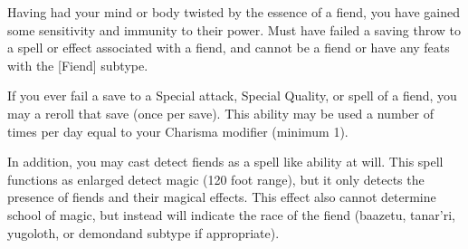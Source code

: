  {}
\shortdescfeat
{Having had your mind or body twisted by the essence of a fiend, you have gained some sensitivity and immunity to their power.}
{Must have failed a saving throw to a spell or effect associated with a fiend, and cannot be a fiend or have any feats with the [Fiend] subtype.}
{If you ever fail a save to a Special attack, Special Quality, or spell of a fiend, you may a reroll that save (once per save). This ability may be used a number of times per day equal to your Charisma modifier (minimum 1).

	In addition, you may cast detect fiends as a spell like ability at will. This spell functions as enlarged detect magic (120 foot range), but it only detects the presence of fiends and their magical effects. This effect also cannot determine school of magic, but instead will indicate the race of the fiend (baazetu, tanar'ri, yugoloth, or demondand subtype if appropriate).}